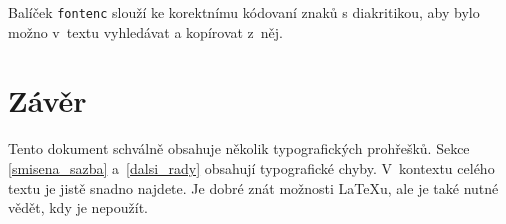 \documentclass[10pt, a4paper, twocolumn]{article}
\begin{document}
Balíček \texttt{fontenc} slouží ke korektnímu kódovaní znaků s diakritikou, aby bylo možno v~textu vyhledávat a kopírovat z~něj.

\section{Závěr}

Tento dokument schválně obsahuje několik typografických prohřešků. Sekce \ref{smisena_sazba} a~\ref{dalsi_rady} obsahují typografické chyby. V~kontextu celého textu je jistě snadno najdete. Je dobré znát možnosti \LaTeX u, ale je také nutné vědět, kdy je nepoužít.
\end{document}
